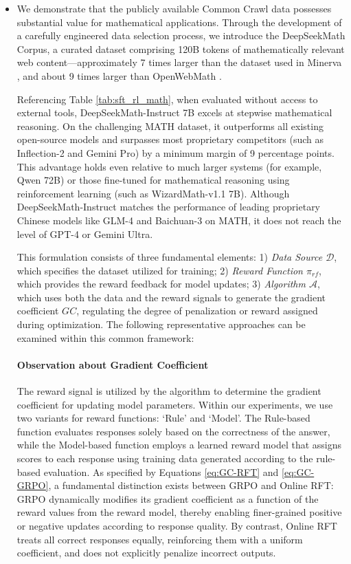 \begin{itemize}[topsep=0pt]
    \item We demonstrate that the publicly available Common Crawl data possesses substantial value for mathematical applications. Through the development of a carefully engineered data selection process, we introduce the DeepSeekMath Corpus, a curated dataset comprising 120B tokens of mathematically relevant web content—approximately 7 times larger than the dataset used in Minerva \citep{minerva}, and about 9 times larger than OpenWebMath \citep{openwebmath}.

Referencing Table \ref{tab:sft_rl_math}, when evaluated without access to external tools, DeepSeekMath-Instruct 7B excels at stepwise mathematical reasoning. On the challenging MATH dataset, it outperforms all existing open-source models and surpasses most proprietary competitors (such as Inflection-2 and Gemini Pro) by a minimum margin of 9 percentage points. This advantage holds even relative to much larger systems (for example, Qwen 72B) or those fine-tuned for mathematical reasoning using reinforcement learning (such as WizardMath-v1.1 7B). Although DeepSeekMath-Instruct matches the performance of leading proprietary Chinese models like GLM-4 and Baichuan-3 on MATH, it does not reach the level of GPT-4 or Gemini Ultra.

This formulation consists of three fundamental elements: 1) \textit{Data Source $\mathcal{D}$}, which specifies the dataset utilized for training; 2) \textit{Reward Function $\pi_{{rf}}$}, which provides the reward feedback for model updates; 3) \textit{Algorithm $\mathcal{A}$}, which uses both the data and the reward signals to generate the gradient coefficient $GC$, regulating the degree of penalization or reward assigned during optimization. The following representative approaches can be examined within this common framework:

\paragraph{Observation about Gradient Coefficient} The reward signal is utilized by the algorithm to determine the gradient coefficient for updating model parameters. Within our experiments, we use two variants for reward functions: `Rule' and `Model'. The Rule-based function evaluates responses solely based on the correctness of the answer, while the Model-based function employs a learned reward model that assigns scores to each response using training data generated according to the rule-based evaluation. As specified by Equations \ref{eq:GC-RFT} and \ref{eq:GC-GRPO}, a fundamental distinction exists between GRPO and Online RFT: GRPO dynamically modifies its gradient coefficient as a function of the reward values from the reward model, thereby enabling finer-grained positive or negative updates according to response quality. By contrast, Online RFT treats all correct responses equally, reinforcing them with a uniform coefficient, and does not explicitly penalize incorrect outputs.


\end{itemize}
